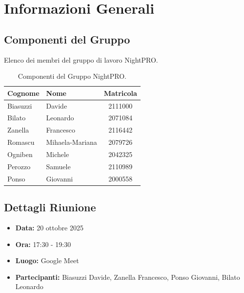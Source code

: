 \documentclass[a4paper, 11pt, oneside]{scrartcl} %
\begin{document}
\newpage
\tableofcontents %
\pagestyle{fancy} %

\newpage
\section{Informazioni Generali}

\subsection{Componenti del Gruppo}
Elenco dei membri del gruppo di lavoro NightPRO.

\begin{table}[h!]
\centering
\begin{tabular}{@{}llc@{}}
\toprule
\textbf{Cognome} & \textbf{Nome} & \textbf{Matricola} \\
\midrule
Biasuzzi & Davide & 2111000 \\
Bilato & Leonardo & 2071084 \\
Zanella & Francesco & 2116442 \\
Romascu & Mihaela-Mariana & 2079726 \\
Ogniben & Michele & 2042325 \\
Perozzo & Samuele & 2110989 \\
Ponso & Giovanni & 2000558 \\
\bottomrule
\end{tabular}
\caption{Componenti del Gruppo NightPRO.}
\end{table}

\subsection{Dettagli Riunione}
\begin{itemize}
    \item \textbf{Data:} 20 ottobre 2025
    \item \textbf{Ora:} 17:30 - 19:30
    \item \textbf{Luogo:} Google Meet
    \item \textbf{Partecipanti:} Biasuzzi Davide, Zanella Francesco, Ponso Giovanni, Bilato Leonardo
\end{itemize}
\end{document}
